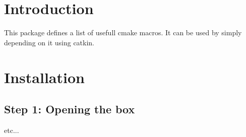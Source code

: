 \hypertarget{index_intro_sec}{}\section{Introduction}\label{index_intro_sec}
This package defines a list of usefull cmake macros. It can be used by simply depending on it using catkin.\hypertarget{index_install_sec}{}\section{Installation}\label{index_install_sec}
\hypertarget{index_step1}{}\subsection{Step 1\+: Opening the box}\label{index_step1}
etc... 